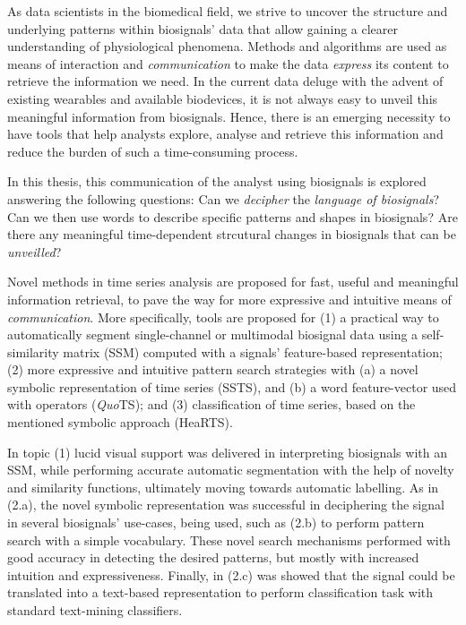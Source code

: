
%

As data scientists in the biomedical field, we strive to uncover the structure and underlying patterns within biosignals' data that allow gaining a clearer understanding of physiological phenomena. Methods and algorithms are used as means of interaction and \textit{communication} to make the data \textit{express} its content to retrieve the information we need. In the current data deluge with the advent of existing wearables and available biodevices, it is not always easy to unveil this meaningful information from biosignals. Hence, there is an emerging necessity to have tools that help analysts explore, analyse and retrieve this information and reduce the burden of such a time-consuming process. 

In this thesis, this communication of the analyst using biosignals is explored answering the following questions: Can we \textit{decipher} the \textit{language of biosignals}? Can we then use words to describe specific patterns and shapes in biosignals? Are there any meaningful time-dependent strcutural changes in biosignals that can be \textit{unveilled}? 

Novel methods in time series analysis are proposed for fast, useful and meaningful information retrieval, to pave the way for more expressive and intuitive means of \textit{communication}. More specifically, tools are proposed for (1) a practical way to automatically segment single-channel or multimodal biosignal data using a self-similarity matrix (SSM) computed with a signals' feature-based representation; (2) more expressive and intuitive pattern search strategies with (a) a novel symbolic representation of time series (SSTS), and (b) a word feature-vector used with operators (\textit{Quo}TS); and (3) classification of time series, based on the mentioned symbolic approach (HeaRTS). 

In topic (1) lucid visual support was delivered in interpreting biosignals with an SSM, while performing accurate automatic segmentation with the help of novelty and similarity functions, ultimately moving towards automatic labelling. As in (2.a), the novel symbolic representation was successful in deciphering the signal in several biosignals' use-cases, being used, such as (2.b) to perform pattern search with a simple vocabulary. These novel search mechanisms performed with good accuracy in detecting the desired patterns, but mostly with increased intuition and expressiveness. Finally, in (2.c) was showed that the signal could be translated into a text-based representation to perform classification task with standard text-mining classifiers.


